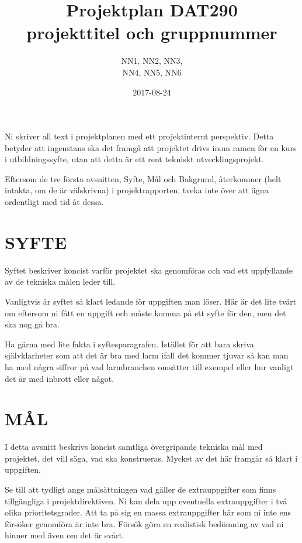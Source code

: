 \documentclass[a4paper]{article}
\title{Projektplan DAT290 \\ \Large projekttitel och gruppnummer}
\author{NN1, NN2, NN3,\\
            NN4, NN5, NN6}
\date{2017-08-24}
\begin{document}
\maketitle
{}
\newpage

\tableofcontents
\newpage


Ni skriver all text i projektplanen med ett projektinternt perspektiv.
Detta betyder att ingenstans ska det framgå att projektet drivs inom
ramen för en kurs i utbildningssyfte, utan att detta är ett rent
tekniskt utvecklingsprojekt.

Eftersom de tre första avsnitten, Syfte, Mål och Bakgrund, återkommer
(helt intakta, om de är välskrivna) i projektrapporten, tveka inte över
att ägna ordentligt med tid åt dessa.



\section{SYFTE}
\label{sec:syfte}


Syftet beskriver koncist varför projektet ska genomföras och vad ett
uppfyllande av de tekniska målen leder till.

Vanligtvis är syftet så klart ledande för uppgiften man löser. Här är
det lite tvärt om eftersom ni fått en uppgift och måste komma på ett
syfte för den, men det ska nog gå bra.

Ha gärna med lite fakta i syftesparagrafen. Istället för att bara skriva
självklarheter som att det är bra med larm ifall det kommer tjuvar så
kan man ha med några siffror på vad larmbranchen omsätter till exempel
eller hur vanligt det är med inbrott eller något.



\section{MÅL}
\label{sec:mål}


I detta avsnitt beskrivs koncist samtliga övergripande tekniska mål med
projektet, det vill säga, vad ska konstrueras. Mycket av det här
framgår så klart i uppgiften.

Se till att tydligt ange målsättningen vad gäller de extrauppgifter som
finns tillgängliga i projektdirektiven. Ni kan dela upp eventuella
extrauppgifter i två olika prioritetsgrader. Att ta på sig en massa
extrauppgifter här som ni inte ens försöker genomföra är inte bra.
Försök göra en realistisk bedömning av vad ni hinner med även om det är
svårt.
\end{document}

